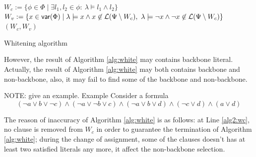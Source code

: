 \begin{algorithm}
\SetAlgoShortEnd
\SetFillComment
{}
$W_c:= \{\phi\in\Phi \mid \exists l_1,l_2\in\phi: \ \lambda\models l_1\wedge l_2\}$\; \label{alg2:inital}
$W_v:=\{x\in \textsf{var}(\Phi)\mid \lambda\models x\wedge x\not\in {\cal L}(\Psi\setminus W_c),
        \ \lambda\models \neg x\wedge \neg x\not\in {\cal L}(\Psi\setminus W_c)\}$\;
\Return $(W_c, W_v)$\;
\caption{Whitening algorithm}
\label{alg:white}
\end{algorithm}

However, the result of Algorithm \ref{alg:white} may contains backbone literal. Actually, the result of Algorithm \ref{alg:white} may both contains backbone and non-backbone, also, it may fail to find some of the backbone and non-backbone.

NOTE: give an example.
Example
Consider a formula 
\[(\neg a\vee b\vee\neg c)\wedge(\neg a\vee\neg b\vee c)\wedge(\neg a\vee b\vee d)\wedge(\neg c\vee d)\wedge(a\vee d)\]


The reason of inaccuracy of Algorithm \ref{alg:white} is as follows: at Line \ref{alg2:wc}, no clause is removed from $W_c$ in order to guarantee the termination of Algorithm \ref{alg:white}; during the change of assignment, some of the clauses doesn't has at least two satisfied literals any more, it affect the non-backbone selection.

